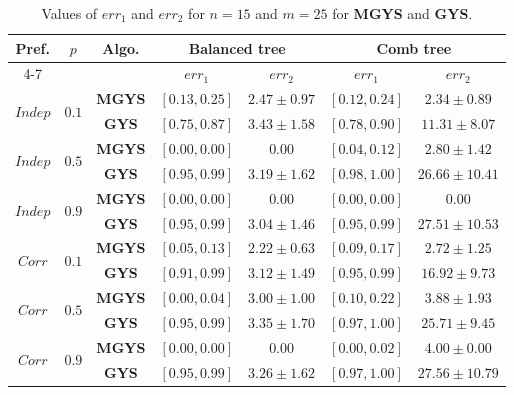 \documentclass[]{article}
\begin{document}
\begin{table}[h!]
    \centering
    \caption{Values of $err_1$ and $err_2$  for $n=15$ and $m=25$ for \textbf{MGYS} and \textbf{GYS}.}
    \begin{tabular}{|c|c|c||cc||cc|}
        \hline
        \multirow{2}{*}{Pref.} & \multirow{2}{*}{$p$} & \multirow{2}{*}{Algo.} & \multicolumn{2}{c||}{Balanced tree} & \multicolumn{2}{c|}{Comb tree} \\
        \cline{4-7}
        & & & $err_1$ & $err_2$ & $err_1$ & $err_2$ \\
        \hline \hline
        \multirow{2}{*}{$Indep$} & \multirow{2}{*}{$0.1$} 
            & \textbf{MGYS} & $[0.13, 0.25]$ & $2.47 \pm 0.97$ & $[0.12, 0.24]$ & $2.34 \pm 0.89$ \\
        & & \textbf{GYS}  & $[0.75, 0.87]$ & $3.43 \pm 1.58$ & $[0.78, 0.90]$ & $11.31 \pm 8.07$ \\
        \hline
        \multirow{2}{*}{$Indep$} & \multirow{2}{*}{$0.5$} 
            & \textbf{MGYS} & $[0.00, 0.00]$ & $0.00$ & $[0.04, 0.12]$ & $2.80 \pm 1.42$ \\
        & & \textbf{GYS}  & $[0.95, 0.99]$ & $3.19 \pm 1.62$ & $[0.98, 1.00]$ & $26.66 \pm 10.41$ \\
        \hline
        \multirow{2}{*}{$Indep$} & \multirow{2}{*}{$0.9$} 
            & \textbf{MGYS} & $[0.00, 0.00]$ & $0.00$ & $[0.00, 0.00]$ & $0.00$ \\
        & & \textbf{GYS}  & $[0.95, 0.99]$ & $3.04 \pm 1.46$ & $[0.95, 0.99]$ & $27.51 \pm 10.53$ \\
        \hline \hline
        \multirow{2}{*}{$Corr$} & \multirow{2}{*}{$0.1$} 
            & \textbf{MGYS} & $[0.05, 0.13]$ & $2.22 \pm 0.63$ & $[0.09, 0.17]$ & $2.72 \pm 1.25$ \\
        & & \textbf{GYS}  & $[0.91, 0.99]$ & $3.12 \pm 1.49$ & $[0.95, 0.99]$ & $16.92 \pm 9.73$ \\
        \hline
        \multirow{2}{*}{$Corr$} & \multirow{2}{*}{$0.5$} 
            & \textbf{MGYS} & $[0.00, 0.04]$ & $3.00 \pm 1.00$ & $[0.10, 0.22]$ & $3.88 \pm 1.93$ \\
        & & \textbf{GYS}  & $[0.95, 0.99]$ & $3.35 \pm 1.70$ & $[0.97, 1.00]$ & $25.71 \pm 9.45$ \\
        \hline
        \multirow{2}{*}{$Corr$} & \multirow{2}{*}{$0.9$} 
            & \textbf{MGYS} & $[0.00, 0.00]$ & $0.00$ & $[0.00, 0.02]$ & $4.00 \pm 0.00$ \\
        & & \textbf{GYS}  & $[0.95, 0.99]$ & $3.26 \pm 1.62$ & $[0.97, 1.00]$ & $27.56 \pm 10.79$ \\
        \hline
    \end{tabular}
    \label{tab:preferences_fairness_GYS}
\end{table}
\end{document}
